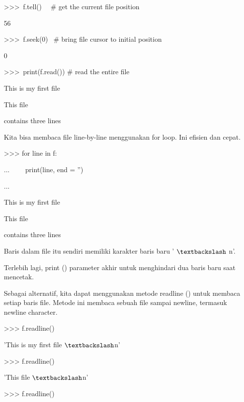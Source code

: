 \vspace{12pt}
>>>~f.tell()~~   $  \#  $ get the current file position \par
56 \par
\vspace{12pt}
>>>~f.seek(0)~   $  \#  $ bring file cursor to initial position \par
0 \par
\vspace{12pt}
>>>~print(f.read())   $  \#  $ read the entire file \par
This is my first file \par
This file \par
contains three lines \par
\vspace{12pt}
\vspace{12pt}
Kita bisa membaca file line-by-line menggunakan for loop. Ini efisien dan cepat. \par
\vspace{12pt}
>>> for line in f: \par
...~~~~ print(line, end = '') \par
... \par
This is my first file \par
This file \par
contains three lines \par
\vspace{12pt}
\vspace{12pt}
Baris dalam file itu sendiri memiliki karakter baris baru ' $  \textbackslash  $ n'. \par
\vspace{12pt}
Terlebih lagi, print () parameter akhir untuk menghindari dua baris baru saat mencetak. \par
\vspace{12pt}
Sebagai alternatif, kita dapat menggunakan metode readline () untuk membaca setiap baris file. Metode ini membaca sebuah file sampai newline, termasuk newline character. \par
\vspace{12pt}
>>> f.readline() \par
'This is my first file $  \textbackslash  $n' \par
\vspace{12pt}
>>> f.readline() \par
'This file $  \textbackslash  $n' \par
\vspace{12pt}
>>> f.readline() \par
